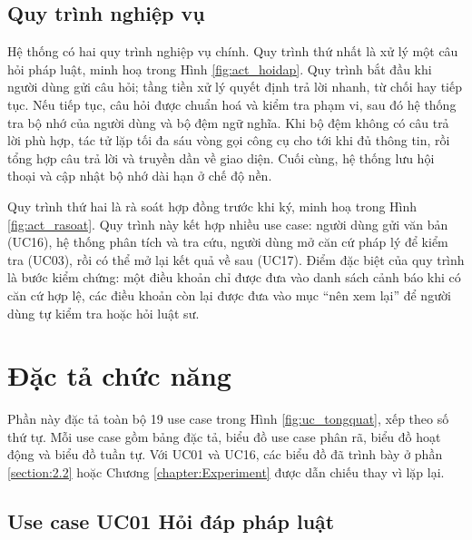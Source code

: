 \documentclass[../DoAn.tex]{subfiles}
\begin{document}

\subsection{Quy trình nghiệp vụ}
\label{subsection:2.2.6}
Hệ thống có hai quy trình nghiệp vụ chính. Quy trình thứ nhất là xử lý một câu hỏi pháp luật, minh hoạ trong Hình \ref{fig:act_hoidap}. Quy trình bắt đầu khi người dùng gửi câu hỏi; tầng tiền xử lý quyết định trả lời nhanh, từ chối hay tiếp tục. Nếu tiếp tục, câu hỏi được chuẩn hoá và kiểm tra phạm vi, sau đó hệ thống tra bộ nhớ của người dùng và bộ đệm ngữ nghĩa. Khi bộ đệm không có câu trả lời phù hợp, tác tử lặp tối đa sáu vòng gọi công cụ cho tới khi đủ thông tin, rồi tổng hợp câu trả lời và truyền dần về giao diện. Cuối cùng, hệ thống lưu hội thoại và cập nhật bộ nhớ dài hạn ở chế độ nền.


Quy trình thứ hai là rà soát hợp đồng trước khi ký, minh hoạ trong Hình \ref{fig:act_rasoat}. Quy trình này kết hợp nhiều use case: người dùng gửi văn bản (UC16), hệ thống phân tích và tra cứu, người dùng mở căn cứ pháp lý để kiểm tra (UC03), rồi có thể mở lại kết quả về sau (UC17). Điểm đặc biệt của quy trình là bước kiểm chứng: một điều khoản chỉ được đưa vào danh sách cảnh báo khi có căn cứ hợp lệ, các điều khoản còn lại được đưa vào mục ``nên xem lại'' để người dùng tự kiểm tra hoặc hỏi luật sư.


\section{Đặc tả chức năng}
\label{section:2.3}
Phần này đặc tả toàn bộ 19 use case trong Hình \ref{fig:uc_tongquat}, xếp theo số thứ tự. Mỗi use case gồm bảng đặc tả, biểu đồ use case phân rã, biểu đồ hoạt động và biểu đồ tuần tự. Với UC01 và UC16, các biểu đồ đã trình bày ở phần \ref{section:2.2} hoặc Chương \ref{chapter:Experiment} được dẫn chiếu thay vì lặp lại.

\subsection{Use case UC01 Hỏi đáp pháp luật}
\label{subsection:uc01}
\end{document}
